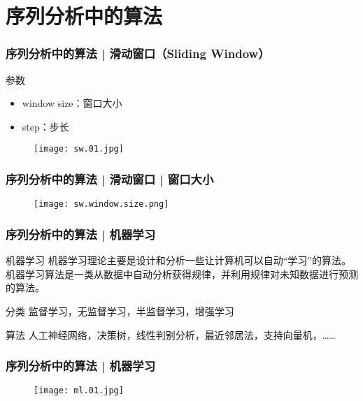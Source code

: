 \section{序列分析中的算法}
\begin{frame}
  \frametitle{序列分析中的算法 | 滑动窗口（Sliding Window）}
  \begin{block}{参数}
    \begin{itemize}
      \item window size：窗口大小
      \item step：步长
    \end{itemize}
  \end{block}
  \begin{figure}
    \centering
    \texttt{[image: sw.01.jpg]}
  \end{figure}
\end{frame}

\begin{frame}
  \frametitle{序列分析中的算法 | 滑动窗口 | 窗口大小}
  \begin{figure}
    \centering
    \texttt{[image: sw.window.size.png]}
  \end{figure}
\end{frame}

\begin{frame}
  \frametitle{序列分析中的算法 | 机器学习}
  \begin{block}{机器学习}
    机器学习理论主要是设计和分析一些让计算机可以自动“学习”的算法。机器学习算法是一类从数据中自动分析获得规律，并利用规律对未知数据进行预测的算法。
  \end{block}
  \pause
  \begin{block}{分类}
    监督学习，无监督学习，半监督学习，增强学习
  \end{block}
  \pause
  \begin{block}{算法}
    人工神经网络，决策树，线性判别分析，最近邻居法，支持向量机，……
  \end{block}
\end{frame}

\begin{frame}
  \frametitle{序列分析中的算法 | 机器学习}
  \begin{figure}
    \centering
    \texttt{[image: ml.01.jpg]}
  \end{figure}
\end{frame}

